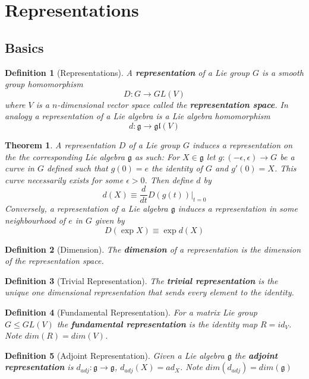 \documentclass{article}
\newtheorem{theorem}{Theorem}[section]
\newtheorem{definition}{Definition}[subsection]
\newcommand{\bam}[1]{\textbf{#1}}
\newcommand{\mf}[1]{\mathfrak{#1}}
\begin{document}
\section{Representations}

\subsection{Basics}

\begin{definition}[Representations]
A \bam{representation} of a Lie group $G$ is a smooth group homomorphism 
\[
D:G\to GL\left(V\right)
\]
where $V$ is a $n$-dimensional vector space called the \bam{representation space}.
In analogy a representation of a Lie algebra is a Lie algebra homomorphism 
\[
d:\mf{g} \to \mf{gl}\left(V\right)
\]
\end{definition}

\begin{theorem}
A representation $D$ of a Lie group $G$ induces a representation on the the corresponding Lie algebra $\mf{g}$ as such: For $X\in\mf{g}$ let $g:(-\epsilon, \epsilon)\to G$ be a curve in $G$ defined such that $g(0)=e$ the identity of $G$ and $g'(0)=X$. This curve necessarily exists for some $\epsilon>0$. Then define $d$ by \[
d(X)\equiv\frac{d}{dt} D\left(g(t)\right) \vert_{t=0}
\]
Conversely, a representation of a Lie algebra $\mf{g}$ induces a representation in some neighbourhood of $e$ in $G$ given by 
\[
D(\exp{X})\equiv\exp{d(X)}
\]
\end{theorem}

\begin{definition}[Dimension]
The \bam{dimension} of a representation is the dimension of the representation space.
\end{definition}

\begin{definition}[Trivial Representation] 
The \bam{trivial representation} is the unique one dimensional representation that sends every element to the identity. 
\end{definition}

\begin{definition}[Fundamental Representation]
For a matrix Lie group $G\leq GL(V)$ the \bam{fundamental representation} is the identity map $R=id_V$. Note $dim\left(R\right)=dim\left(V\right)$.
\end{definition}

\begin{definition}[Adjoint Representation]
Given a Lie algebra $\mf{g}$ the \bam{adjoint representation} is $d_{adj}:\mf{g}\to\mf{g}$, $d_{adj}\left(X\right)=ad_X $. Note $dim\left(d_{adj}\right)=dim\left(\mf{g}\right)$
\end{definition}
\end{document}
